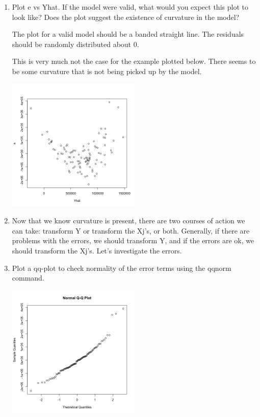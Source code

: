 \documentclass[11pt]{article}
\begin{document}
\begin{enumerate}
\begin{enumerate}
\item 
Plot e vs Yhat. If the model were valid, what would you expect this 
plot to look like? Does the plot suggest the existence of curvature 
in the model? 

The plot for a valid model should be a banded straight line. The residuals 
should be randomly distributed about 0. 

This is very much not the case for the example plotted below. There seems 
to be some curvature that is not being picked up by the model. 

\begin{center}
\includegraphics[width=0.5\textwidth]{Yhat_vs_e}
\end{center}

\item 
Now that we know curvature is present, there are two courses of 
action we can take: transform Y or transform the Xj's, or both. 
Generally, if there are problems with the errors, we should transform 
Y, and if the errors are ok, we should transform the Xj's. Let's 
investigate the errors. 

\item 
Plot a qq-plot to check normality of the error terms using the qqnorm 
command. 

\begin{center}
\includegraphics[width=0.5\textwidth]{residuals_qq_plot}
\end{center}
	

\end{enumerate}
\end{enumerate}
\end{document}
